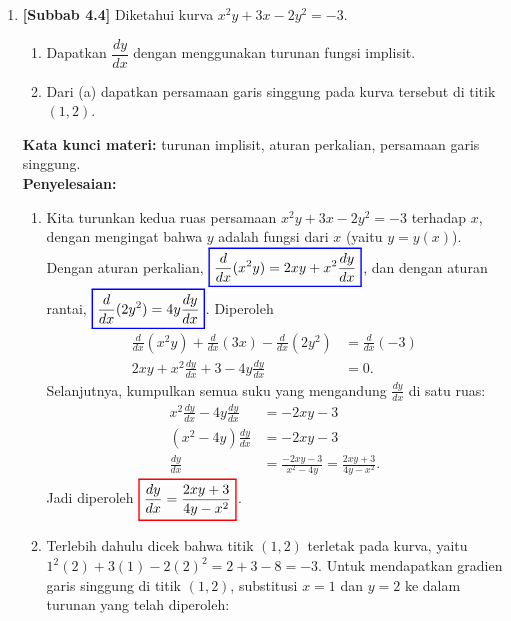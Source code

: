 \documentclass[10pt,openany,a4paper]{article}
\theoremstyle{definition}
\theoremstyle{definition}
\theoremstyle{plain}
\newenvironment{jawab}[2][tes]{%
\par\noindent\textbf{Kata kunci materi:} #1.\\
\textbf{Penyelesaian:} #2%
}{}
\begin{document}
\begin{enumerate}
    \item \textbf{[Subbab 4.4]} Diketahui kurva $x^2y+3x-2y^2=-3$.
    \begin{enumerate}
        \item Dapatkan $\dfrac{dy}{dx}$ dengan menggunakan turunan fungsi implisit.
        \item Dari (a) dapatkan persamaan garis singgung pada kurva tersebut di titik $(1,2)$.
    \end{enumerate}
    \begin{jawab}[turunan implisit, aturan perkalian, persamaan garis singgung]{
        \begin{enumerate}
            \item Kita turunkan kedua ruas persamaan $x^2y+3x-2y^2=-3$ terhadap $x$, dengan mengingat bahwa $y$ adalah fungsi dari $x$ (yaitu $y=y(x)$). Dengan aturan perkalian, $\colorlet{oldcolor}{.}
        \color{blue}
        \setlength{\fboxrule}{1pt} \boxed{\color{oldcolor}\frac{d}{dx}(x^2y) = 2xy + x^2\frac{dy}{dx}}\color{oldcolor}$, dan dengan aturan rantai, $\colorlet{oldcolor}{.}
        \color{blue}
        \setlength{\fboxrule}{1pt} \boxed{\color{oldcolor}\frac{d}{dx}(2y^2) = 4y\frac{dy}{dx}}\color{oldcolor}$. Diperoleh
            \begin{align*}
                \frac{d}{dx}(x^2y) + \frac{d}{dx}(3x) - \frac{d}{dx}(2y^2) &= \frac{d}{dx}(-3)\\
                2xy + x^2\frac{dy}{dx} + 3 - 4y\frac{dy}{dx} &= 0.
            \end{align*}
            Selanjutnya, kumpulkan semua suku yang mengandung $\frac{dy}{dx}$ di satu ruas:
            \begin{align*}
                x^2\frac{dy}{dx} - 4y\frac{dy}{dx} &= -2xy - 3\\
                (x^2 - 4y)\frac{dy}{dx} &= -2xy - 3\\
                \frac{dy}{dx} &= \frac{-2xy - 3}{x^2 - 4y} = \frac{2xy+3}{4y-x^2}.
            \end{align*}
            Jadi diperoleh $\colorlet{oldcolor}{.}
        \color{red}
        \setlength{\fboxrule}{1pt} \boxed{\color{oldcolor}\frac{dy}{dx} = \frac{2xy + 3}{4y - x^2}}\color{oldcolor}$.
            \item Terlebih dahulu dicek bahwa titik $(1,2)$ terletak pada kurva, yaitu $1^2(2)+3(1)-2(2)^2=2+3-8=-3$. Untuk mendapatkan gradien garis singgung di titik $(1,2)$, substitusi $x=1$ dan $y=2$ ke dalam turunan yang telah diperoleh:
            \begin{align*}

\end{align*}
\end{enumerate}}
\end{jawab}
\end{enumerate}
\end{document}

